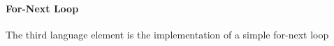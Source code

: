 \paragraph{For-Next Loop}
\label{sec:ForNextLoop}
The third language element is the implementation of a simple for-next loop
%


